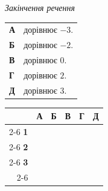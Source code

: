 \documentclass[12pt]{article}
\begin{document}
\begin{samepage}
\nmtnobreak
\noindent
\begin{minipage}[t]{0.55\textwidth}
    \textit{Закінчення речення} \par\par\nbvspace{0.2cm}
    \begin{tabular}{ll}
    \textbf{А} & дорівнює $-3$. \\
    \textbf{Б} & дорівнює $-2$. \\
    \textbf{В} & дорівнює $0$. \\
    \textbf{Г} & дорівнює $2$. \\
    \textbf{Д} & дорівнює $3$. \\
    \end{tabular}
\end{minipage}%
\hfill
\begin{minipage}[t]{0.40\textwidth}
    \nopagebreak\nbvspace{0.5cm} %
    \begin{flushright}
    \begingroup
    \setlength{\tabcolsep}{4pt}
    \renewcommand{\arraystretch}{1.2}
    \small
    \begin{tabular}{r|c|c|c|c|c|}
         \multicolumn{1}{c}{} & \multicolumn{1}{c}{\textbf{А}} & \multicolumn{1}{c}{\textbf{Б}} & \multicolumn{1}{c}{\textbf{В}} & \multicolumn{1}{c}{\textbf{Г}} & \multicolumn{1}{c}{\textbf{Д}} \\ \cline{2-6}
         \textbf{1} & & & & & \\ \cline{2-6}
         \textbf{2} & & & & & \\ \cline{2-6}
         \textbf{3} & & & & & \\ \cline{2-6}
    \end{tabular}
    \endgroup
    \end{flushright}
\end{minipage}
\par{}\vspace{0.25cm}
\end{samepage}
\end{document}
